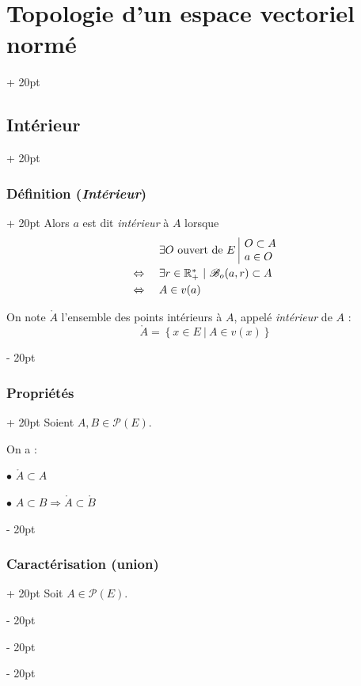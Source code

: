 \documentclass[a4paper, 12pt, twoside]{article}
\newcommand{\R}{\mathbb{R}} %
\newcommand{\set}[1]{\left\{ #1 \right\}}
\newcommand{\ssi}{\ \Leftrightarrow \ }
\newcommand{\ind}[1][20pt]{\advance\leftskip + #1}
\newcommand{\deind}[1][20pt]{\advance\leftskip - #1}
\newenvironment{indt}[2][20pt]{#2 \par \ind[#1]}{\par \deind} %
\begin{document}
\begin{indt}{\section{Topologie d'un espace vectoriel normé}}
\begin{indt}{\subsection{Intérieur}}
\begin{indt}{\subsubsection{Définition (\textit{Intérieur})}}
                Alors $a$ est dit \emph{intérieur} à $A$ lorsque
                \[
                    \begin{array}{cl}
                        & \exists O\ \text{ouvert de}\ E\
                        \begin{array}{|l}
                            O \subset A
                            \\
                            a \in O
                        \end{array}
                        \vspace{3pt}
                        \\
                        \ssi&
                        \exists r \in \R^*_+\ |\ \mathscr B_o(a, r) \subset A
                        \vspace{3pt}
                        \\
                        \ssi&
                        A \in v(a)
                    \end{array}
                \]

                On note $\mathring A$ l'ensemble des points intérieurs à $A$, appelé \emph{intérieur} de $A$ :
                \[
                    \mathring A = \set{x \in E\ |\ A \in v(x)}
                \]
            \end{indt}

            \vspace{12pt}
            
            \begin{indt}{\subsubsection{Propriétés}}
                Soient $A, B \in \mathcal P(E)$.

                On a :

                $\bullet$ $\mathring A \subset A$

                $\bullet$ $A \subset B \Rightarrow \mathring A \subset \mathring B$
            \end{indt}

            \vspace{12pt}
            
            \begin{indt}{\subsubsection{Caractérisation (union)}}
                Soit $A \in \mathcal P(E)$.


\end{indt}
\end{indt}
\end{indt}
\end{document}
